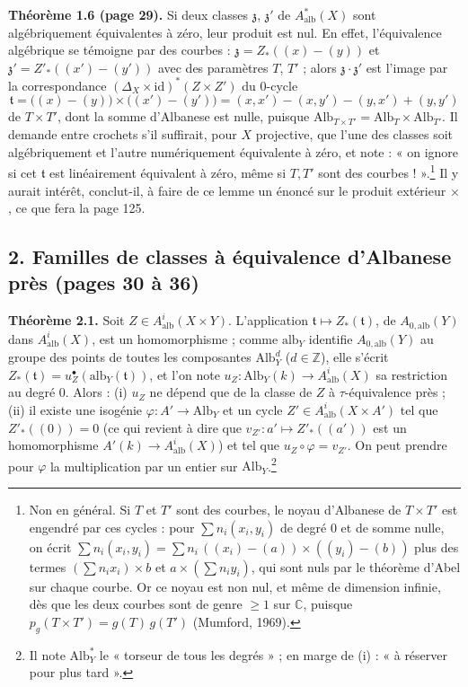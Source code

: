 \documentclass[11pt,a4paper]{article}
\begin{document}
\textbf{Théorème 1.6 (page 29).} Si deux classes $\mathfrak{z}$,
$\mathfrak{z}'$ de $A^{*}_{\mathrm{alb}}(X)$ sont algébriquement équivalentes à
zéro, leur produit est nul. En effet, l'équivalence algébrique se témoigne par
des courbes : $\mathfrak{z} = Z_{*}((x) - (y))$ et $\mathfrak{z}' =
Z'_{*}((x') - (y'))$ avec des paramètres $T$, $T'$ ; alors $\mathfrak{z}\cdot
\mathfrak{z}'$ est l'image par la correspondance $(\Delta_{X} \times
\mathrm{id})^{*}(Z \times Z')$ du $0$-cycle
\[
\mathfrak{t} = \bigl((x) - (y)\bigr) \times \bigl((x') - (y')\bigr)
= (x, x') - (x, y') - (y, x') + (y, y')
\]
de $T \times T'$, dont la somme d'Albanese est nulle, puisque $\mathrm{Alb}_{T
\times T'} = \mathrm{Alb}_{T} \times \mathrm{Alb}_{T'}$. Il demande entre
crochets s'il suffirait, pour $X$ projective, que l'une des classes soit
algébriquement et l'autre numériquement équivalente à zéro, et note : « on
ignore si cet $\mathfrak{t}$ est linéairement équivalent à zéro, même si $T,
T'$ sont des courbes ! ».\footnote{Non en général. Si $T$ et $T'$ sont des
courbes, le noyau d'Albanese de $T \times T'$ est engendré par ces cycles : pour
$\sum n_{i}(x_{i}, y_{i})$ de degré $0$ et de somme nulle, on écrit $\sum
n_{i}(x_{i}, y_{i}) = \sum n_{i}\,((x_{i}) - (a)) \times ((y_{i}) - (b))$ plus
des termes $(\sum n_{i}x_{i}) \times b$ et $a \times (\sum n_{i}y_{i})$, qui
sont nuls par le théorème d'Abel sur chaque courbe. Or ce noyau est non nul, et
même de dimension infinie, dès que les deux courbes sont de genre $\geqslant 1$
sur $\mathbb{C}$, puisque $p_{g}(T \times T') = g(T)\,g(T')$ (Mumford, 1969).}
Il y aurait intérêt, conclut-il, à faire de ce lemme un énoncé sur le produit
extérieur $\times$, ce que fera la page 125.

\subsection*{2. Familles de classes à équivalence d'Albanese près (pages 30 à
36)}

\textbf{Théorème 2.1.} Soit $Z \in A^{i}_{\mathrm{alb}}(X \times Y)$.
L'application $\mathfrak{t} \mapsto Z_{*}(\mathfrak{t})$, de
$A_{0,\mathrm{alb}}(Y)$ dans $A^{i}_{\mathrm{alb}}(X)$, est un homomorphisme ;
comme $\mathrm{alb}_{Y}$ identifie $A_{0,\mathrm{alb}}(Y)$ au groupe des points
de toutes les composantes $\mathrm{Alb}^{d}_{Y}$ ($d \in \mathbb{Z}$), elle
s'écrit $Z_{*}(\mathfrak{t}) = u^{\bullet}_{Z}(\mathrm{alb}_{Y}(\mathfrak{t}))$,
et l'on note $u_{Z} \colon \mathrm{Alb}_{Y}(k) \to A^{i}_{\mathrm{alb}}(X)$ sa
restriction au degré $0$. Alors : (i) $u_{Z}$ ne dépend que de la classe de $Z$
à $\tau$-équivalence près ; (ii) il existe une isogénie $\varphi \colon A' \to
\mathrm{Alb}_{Y}$ et un cycle $Z' \in A^{i}_{\mathrm{alb}}(X \times A')$ tel que
$Z'_{*}((0)) = 0$ (ce qui revient à dire que $v_{Z'} \colon a' \mapsto
Z'_{*}((a'))$ est un homomorphisme $A'(k) \to A^{i}_{\mathrm{alb}}(X)$) et
tel que $u_{Z} \circ \varphi = v_{Z'}$. On peut prendre pour $\varphi$ la
multiplication par un entier sur $\mathrm{Alb}_{Y}$.\footnote{Il note
$\mathrm{Alb}^{*}_{Y}$ le « torseur de tous les degrés » ; en marge de (i) :
« à réserver pour plus tard ».}
\end{document}
